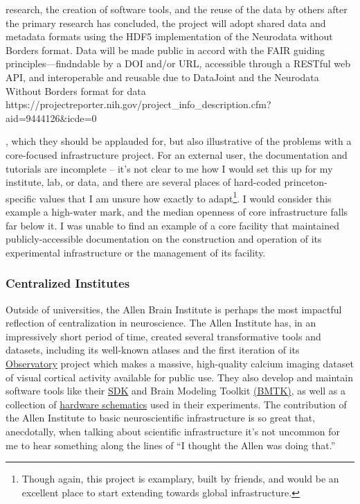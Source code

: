 \documentclass[10pt]{article}
\begin{document}
\begin{multicols}{2}
{\begin{leftbar}
  research, the creation of software tools, and the reuse of the data by
  others after the primary research has concluded, the project will
  adopt shared data and metadata formats using the HDF5 implementation
  of the Neurodata without Borders format. Data will be made public in
  accord with the FAIR guiding principles---findndable by a DOI and/or
  URL, accessible through a RESTful web API, and interoperable and
  reusable due to DataJoint and the Neurodata Without Borders format for
  data
  https://projectreporter.nih.gov/project\_info\_description.cfm?aid=9444126\&icde=0
  \end{leftbar}}, which they should be applauded for, but also
illustrative of the problems with a core-focused infrastructure project.
For an external user, the documentation and tutorials are incomplete --
it's not clear to me how I would set this up for my institute, lab, or
data, and there are several places of hard-coded princeton-specific
values that I am unsure how exactly to adapt\footnote{Though again, this
  project is examplary, built by friends, and would be an excellent
  place to start extending towards global infrastructure.}. I would
consider this example a high-water mark, and the median openness of core
infrastructure falls far below it. I was unable to find an example of a
core facility that maintained publicly-accessible documentation on the
construction and operation of its experimental infrastructure or the
management of its facility.

\hypertarget{centralized-institutes}{%
\subsubsection{Centralized Institutes}\label{centralized-institutes}}

Outside of universities, the Allen Brain Institute is perhaps the most
impactful reflection of centralization in neuroscience. The Allen
Institute has, in an impressively short period of time, created several
transformative tools and datasets, including its well-known atlases \cite{leinGenomewideAtlasGene2007}  and the first iteration of its
\href{http://observatory.brain-map.org/}{Observatory} project which
makes a massive, high-quality calcium imaging dataset of visual cortical
activity available for public use. They also develop and maintain
software tools like their
\href{https://allensdk.readthedocs.io/en/latest/}{SDK} and Brain
Modeling Toolkit \href{https://alleninstitute.github.io/bmtk/}{(BMTK)},
as well as a collection of
\href{https://portal.brain-map.org/explore/toolkit/hardware}{hardware
schematics} used in their experiments. The contribution of the Allen
Institute to basic neuroscientific infrastructure is so great that,
anecdotally, when talking about scientific infrastructure it's not
uncommon for me to hear something along the lines of ``I thought the
Allen was doing that.''


\end{multicols}
\end{document}
